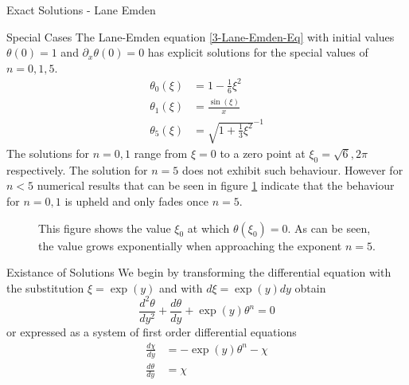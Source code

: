 \begin{section}{Exact Solutions - Lane Emden}
\begin{subsection}{Special Cases}
The Lane-Emden equation \ref{3-Lane-Emden-Eq} with initial values $\theta(0)=1$ and $\partial_x\theta(0)=0$ has explicit solutions \cite[p.~91]{chandrasekharChandrasekharAnIntroductionStudy1958} for the special values of $n=0,1,5$.
\begin{align}
	\theta_0(\xi) &= 1-\frac{1}{6}\xi^2\\
	\theta_1(\xi) &= \frac{\sin(\xi)}{x}\\
	\theta_5(\xi) &= \sqrt{1+\frac{1}{3}\xi^2}^{-1}
\end{align}
The solutions for $n=0,1$ range from $\xi=0$ to a zero point at $\xi_0=\sqrt{6},2\pi$ respectively. The solution for $n=5$ does not exhibit such behaviour. However for $n<5$ numerical results \cite{pleyerGithubRepositoryJonas} that can be seen in figure \ref{5-ExaSol-LE-Exponents} indicate that the behaviour for $n=0,1$ is upheld and only fades once $n=5$.
\begin{figure}[ht]
	\centering
	
	\caption[Lane Emden Exponents]{This figure shows the value $\xi_0$ at which $\theta(\xi_0)=0$. As can be seen, the value grows exponentially when approaching the exponent $n=5$.}
	\label{5-ExaSol-LE-Exponents}
\end{figure}

\end{subsection}
%
%
%
\begin{subsection}{Existance of Solutions}
We begin by transforming the differential equation with the substitution $\xi=\exp(y)$ and with $d\xi = \exp(y)dy$ obtain
\begin{equation}
	\frac{d^2\theta}{dy^2} + \frac{d\theta}{dy} + \exp(y)\theta^n=0
\end{equation}
or expressed as a system of first order differential equations
\begin{align}
	\frac{d\chi}{dy} &= -\exp(y)\theta^n-\chi\nonumber\\
	\frac{d\theta}{dy} &= \chi
\end{align}

\end{subsection}


\end{section}
